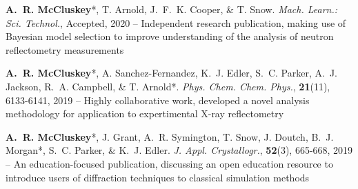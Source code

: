 \begin{cventriesy}
  \cventryy
    {
      \begin{cvitemsy}
        \item {\textbf{A.~R. McCluskey}*, T. Arnold, J.~F.~K. Cooper, \& T. Snow. \emph{Mach. Learn.: Sci. Technol.}, Accepted, 2020 -- Independent research publication, making use of Bayesian model selection to improve understanding of the analysis of neutron reflectometry measurements}
    \vspace{1mm}
        \item {\textbf{A.~R. McCluskey}*, A. Sanchez-Fernandez, K.~J. Edler, S.~C. Parker, A.~J. Jackson, R.~A. Campbell, \& T. Arnold*. \emph{Phys. Chem. Chem. Phys.}, \textbf{21}(11), 6133-6141, 2019 -- Highly collaborative work, developed a novel analysis methodology for application to expertimental X-ray reflectometry}
    \vspace{1mm}
        \item {\textbf{A.~R. McCluskey}*, J. Grant, A.~R. Symington, T. Snow, J. Doutch, B.~J. Morgan*, S.~C. Parker, \& K.~J. Edler. \emph{J. Appl. Crystallogr.}, \textbf{52}(3), 665-668, 2019 -- An education-focused publication, discussing an open education resource to introduce users of diffraction techniques to classical simulation methods} 
      \end{cvitemsy}
    }
\end{cventriesy}
